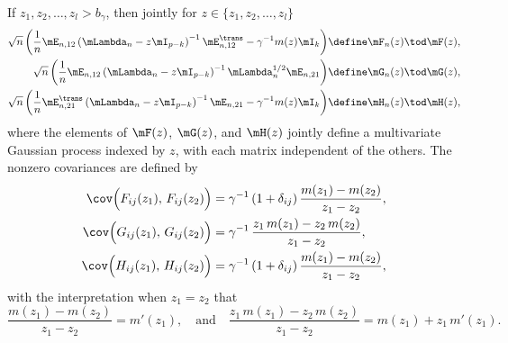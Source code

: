 \begin{lemma}\label{L:eij-product-scaled-limits}
    If $z_1, z_2, \ldots, z_l > b_\gamma$, 
    then jointly for $z \in \{ z_1, z_2, \ldots, z_l \}$
    \begin{subequations}
    \begin{align}
        \sqrt{n}
        \left(
            \frac{1}{n}
            \mE_{n,12}
            \left(
                \mLambda_n
                -
                z
                \mI_{p-k}
            \right)^{-1}
            \mE_{n,12}^\trans
            -
            \gamma^{-1}
            m(z)
            \mI_k
        \right) 
            &\define \mF_n(z)
            \tod \mF(z), \\
        \sqrt{n}
        \left(
            \frac{1}{n}
            \mE_{n,12}
            \left(
                \mLambda_n
                -
                z
                \mI_{p-k}
            \right)^{-1}
            \mLambda_{n}^{1/2}
            \mE_{n,21}
        \right) 
            &\define \mG_n(z)
            \tod \mG(z), \\
        \sqrt{n}
        \left(
            \frac{1}{n}
            \mE_{n,21}^\trans
            \left(
                \mLambda_n
                -
                z
                \mI_{p-k}
            \right)^{-1}
            \mE_{n,21}
            -
            \gamma^{-1}
            m(z)
            \mI_k
        \right) 
            &\define \mH_n(z)
            \tod \mH(z),
    \end{align}
    \end{subequations}
    where the elements of $\mF(z)$, $\mG(z)$, and $\mH(z)$
    jointly define a multivariate Gaussian process indexed by $z$,
    with each matrix independent of the others. 
    The nonzero covariances are defined by
    \begin{subequations}
    \begin{align}
        \cov\Big( F_{ij}(z_1), \, F_{ij}(z_2) \Big)
            &= \gamma^{-1}
               \left( 1 + \delta_{ij} \right)
               \frac{ m(z_1) - m(z_2) }
                    { z_1 - z_2 }, \\
        \cov\Big( G_{ij}(z_1), \, G_{ij}(z_2) \Big)
            &= \gamma^{-1} \,
               \frac{ z_1 \, m(z_1) - z_2 \, m(z_2) }
                    { z_1 - z_2 }, \\
        \cov\Big( H_{ij}(z_1), \, H_{ij}(z_2) \Big)
            &= \gamma^{-1}
               \left( 1 + \delta_{ij} \right)
               \frac{ m(z_1) - m(z_2) }
                    { z_1 - z_2 },
    \end{align}
    \end{subequations}
    with the interpretation when $z_1 = z_2$ that
    \[
        \frac{ m(z_1) - m(z_2) }
             { z_1 - z_2 }
            =
                m'(z_1),
        \quad\text{and}\quad
        \frac{ z_1 \, m(z_1) - z_2 \, m(z_2) }
             { z_1 - z_2 }
            = m( z_1 ) + z_1 \, m'(z_1).
    \]
\end{lemma}
